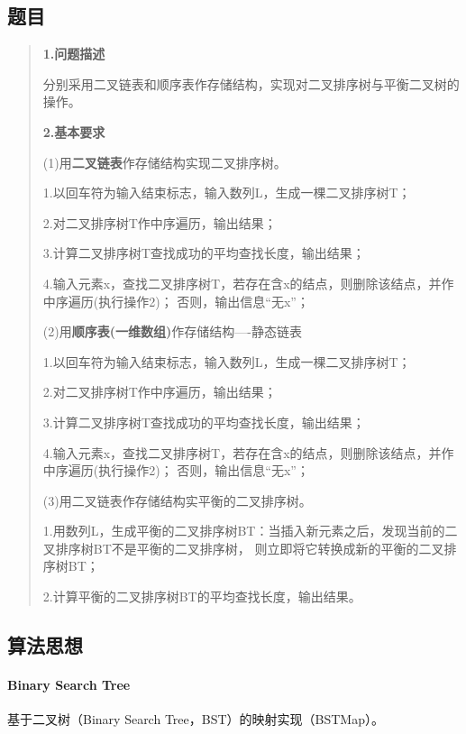 \documentclass[UTF8]{ctexart}
\begin{document}
\subsection*{题目}
\begin{abstract}
    \textbf{1.问题描述}
    
    分别采用二叉链表和顺序表作存储结构，实现对二叉排序树与平衡二叉树的操作。

    \textbf{2.基本要求}

    (1)用\textbf{二叉链表}作存储结构实现二叉排序树。

        1.以回车符为输入结束标志，输入数列L，生成一棵二叉排序树T；

        2.对二叉排序树T作中序遍历，输出结果；

        3.计算二叉排序树T查找成功的平均查找长度，输出结果；

        4.输入元素x，查找二叉排序树T，若存在含x的结点，则删除该结点，并作中序遍历(执行操作2)；
        否则，输出信息“无x”；

    (2)用\textbf{顺序表(一维数组)}作存储结构----静态链表

        1.以回车符为输入结束标志，输入数列L，生成一棵二叉排序树T；

        2.对二叉排序树T作中序遍历，输出结果；

        3.计算二叉排序树T查找成功的平均查找长度，输出结果；

        4.输入元素x，查找二叉排序树T，若存在含x的结点，则删除该结点，并作中序遍历(执行操作2)；
        否则，输出信息“无x”；

    (3)用二叉链表作存储结构实平衡的二叉排序树。

        1.用数列L，生成平衡的二叉排序树BT：当插入新元素之后，发现当前的二叉排序树BT不是平衡的二叉排序树，
        则立即将它转换成新的平衡的二叉排序树BT；

        2.计算平衡的二叉排序树BT的平均查找长度，输出结果。

\end{abstract}


\subsection*{算法思想}

\paragraph*{Binary Search Tree}
基于二叉树（Binary Search Tree，BST）的映射实现（BSTMap）。
\end{document}
